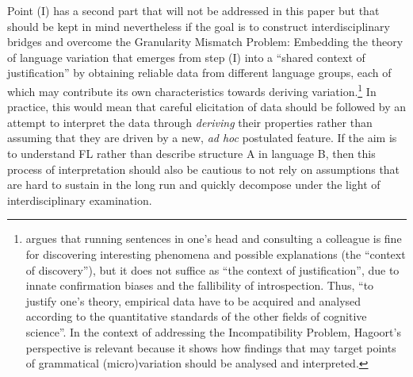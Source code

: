 \documentclass[output=paper]{langsci/langscibook}
\begin{document}
Point (I) has a second part that will not be addressed in this paper but that
should be kept in mind nevertheless if the goal is to construct
interdisciplinary bridges and overcome the Granularity Mismatch Problem:
Embedding the theory of language variation that emerges from step (I) into a
“shared context of justification” \citep{Hagoort2014} by obtaining reliable
data from different language groups, each of which may contribute its own
characteristics towards deriving variation.\footnote{\citet{Hagoort2014} argues
that running sentences in one’s head and consulting a colleague is fine for
discovering interesting phenomena and possible explanations (the \enquote{context of
discovery}), but it does not suffice as \enquote{the context of justification}, due to
innate confirmation biases and the fallibility of introspection. Thus, “to
justify one’s theory, empirical data have to be acquired and analysed according
to the quantitative standards of the other fields of cognitive science”. In the
context of addressing the Incompatibility Problem, Hagoort’s perspective is
relevant because it shows how findings that may target points of grammatical
(micro)variation should be analysed and interpreted.} In practice, this would
mean that careful elicitation of data should be followed by an attempt to
interpret the data through \emph{deriving} their properties rather than
assuming that they are driven by a new, \emph{ad hoc} postulated feature. If
the aim is to understand \gls{FL} rather than describe structure A in language
B, then this process of interpretation should also be cautious to not rely on
assumptions that are hard to sustain in the long run and quickly decompose
under the light of interdisciplinary examination.
\end{document}
